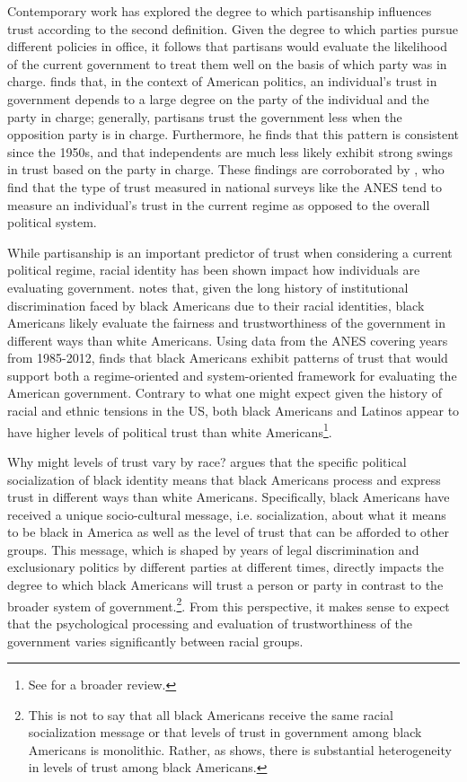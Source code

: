 \documentclass[12t, letterpaper]{article}
\begin{document}
Contemporary work has explored the degree to which partisanship influences trust according to the second definition. Given the degree to which parties pursue different policies in office, it follows that partisans would evaluate the likelihood of the current government to treat them well on the basis of which party was in charge.  \citet{keele2005} finds that, in the context of American politics, an individual's trust in government depends to a large degree on the party of the individual and the party in charge; generally, partisans trust the government less when the opposition party is in charge. Furthermore, he finds that this pattern is consistent since the 1950s, and that independents are much less likely exhibit strong swings in trust based on the party in charge. These findings are corroborated by \citet{cook2005}, who find that the type of trust measured in national surveys like the ANES tend to measure an individual's trust in the current regime as opposed to the overall political system. 

While partisanship is an important predictor of trust when considering a current political regime, racial identity has been shown impact how individuals are evaluating government. \citet{wilkes2015} notes that, given the long history of institutional discrimination faced by black Americans due to their racial identities, black Americans likely evaluate the fairness and trustworthiness of the government in different ways than white Americans. Using data from the ANES covering years from 1985-2012, \citeauthor{wilkes2015} finds that black Americans exhibit patterns of trust that would support both a regime-oriented and system-oriented framework for evaluating the American government. Contrary to what one might expect given the history of racial and ethnic tensions in the US, both black Americans and Latinos appear to have higher levels of political trust than white Americans\footnote{See \citet{wilkes2018} for a broader review.}.

Why might levels of trust vary by race? \citet{nunnally2012} argues that the specific political socialization of black identity means that black Americans process and express trust in different ways than white Americans. Specifically, black Americans have received a unique socio-cultural message, i.e. socialization, about what it means to be black in America as well as the level of trust that can be afforded to other groups. This message, which is shaped by years of legal discrimination and exclusionary politics by different parties at different times, directly impacts the degree to which black Americans will trust a person or party in contrast to the broader system of government.\footnote{This is not to say that all black Americans receive the same racial socialization message or that levels of trust in government among black Americans is monolithic. Rather, as \citeauthor{nunnally2012} shows, there is substantial heterogeneity in levels of trust among black Americans.}. From this perspective, it makes sense to expect that the psychological processing and evaluation of trustworthiness of the government varies significantly between racial groups.
\end{document}

